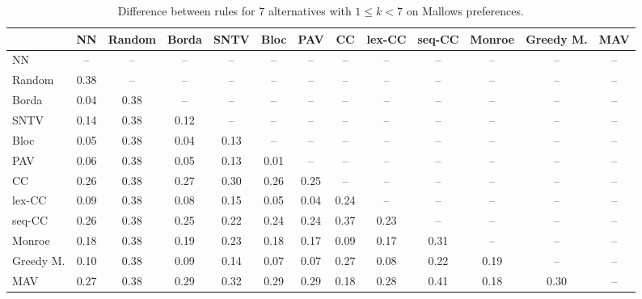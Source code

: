 
\begin{table*}[htbp]
\centering
\begin{tabular}{lcccccccccccc}
\toprule
 & NN & Random & Borda & SNTV & Bloc & PAV & CC & lex-CC & seq-CC & Monroe & Greedy M. & MAV \\
\midrule
NN & -- & -- & -- & -- & -- & -- & -- & -- & -- & -- & -- & -- \\
Random & \cellcolor{blue!38} 0.38 & -- & -- & -- & -- & -- & -- & -- & -- & -- & -- & -- \\
Borda & \cellcolor{blue!4} 0.04 & \cellcolor{blue!38} 0.38 & -- & -- & -- & -- & -- & -- & -- & -- & -- & -- \\
SNTV & \cellcolor{blue!14} 0.14 & \cellcolor{blue!38} 0.38 & \cellcolor{blue!12} 0.12 & -- & -- & -- & -- & -- & -- & -- & -- & -- \\
Bloc & \cellcolor{blue!5} 0.05 & \cellcolor{blue!38} 0.38 & \cellcolor{blue!4} 0.04 & \cellcolor{blue!13} 0.13 & -- & -- & -- & -- & -- & -- & -- & -- \\
PAV & \cellcolor{blue!6} 0.06 & \cellcolor{blue!38} 0.38 & \cellcolor{blue!5} 0.05 & \cellcolor{blue!13} 0.13 & \cellcolor{blue!1} 0.01 & -- & -- & -- & -- & -- & -- & -- \\
CC & \cellcolor{blue!26} 0.26 & \cellcolor{blue!38} 0.38 & \cellcolor{blue!27} 0.27 & \cellcolor{blue!30} 0.30 & \cellcolor{blue!26} 0.26 & \cellcolor{blue!25} 0.25 & -- & -- & -- & -- & -- & -- \\
lex-CC & \cellcolor{blue!9} 0.09 & \cellcolor{blue!38} 0.38 & \cellcolor{blue!8} 0.08 & \cellcolor{blue!15} 0.15 & \cellcolor{blue!5} 0.05 & \cellcolor{blue!4} 0.04 & \cellcolor{blue!24} 0.24 & -- & -- & -- & -- & -- \\
seq-CC & \cellcolor{blue!26} 0.26 & \cellcolor{blue!38} 0.38 & \cellcolor{blue!25} 0.25 & \cellcolor{blue!22} 0.22 & \cellcolor{blue!24} 0.24 & \cellcolor{blue!24} 0.24 & \cellcolor{blue!37} 0.37 & \cellcolor{blue!23} 0.23 & -- & -- & -- & -- \\
Monroe & \cellcolor{blue!18} 0.18 & \cellcolor{blue!38} 0.38 & \cellcolor{blue!19} 0.19 & \cellcolor{blue!23} 0.23 & \cellcolor{blue!18} 0.18 & \cellcolor{blue!17} 0.17 & \cellcolor{blue!9} 0.09 & \cellcolor{blue!17} 0.17 & \cellcolor{blue!31} 0.31 & -- & -- & -- \\
Greedy M. & \cellcolor{blue!10} 0.10 & \cellcolor{blue!38} 0.38 & \cellcolor{blue!9} 0.09 & \cellcolor{blue!14} 0.14 & \cellcolor{blue!7} 0.07 & \cellcolor{blue!7} 0.07 & \cellcolor{blue!27} 0.27 & \cellcolor{blue!8} 0.08 & \cellcolor{blue!22} 0.22 & \cellcolor{blue!19} 0.19 & -- & -- \\
MAV & \cellcolor{blue!27} 0.27 & \cellcolor{blue!38} 0.38 & \cellcolor{blue!28} 0.29 & \cellcolor{blue!32} 0.32 & \cellcolor{blue!28} 0.29 & \cellcolor{blue!28} 0.29 & \cellcolor{blue!18} 0.18 & \cellcolor{blue!28} 0.28 & \cellcolor{blue!41} 0.41 & \cellcolor{blue!18} 0.18 & \cellcolor{blue!30} 0.30 & -- \\
\bottomrule
\end{tabular}

\caption{Difference between rules for 7 alternatives with $1 \leq k < 7$ on Mallows preferences.}
\label{tab:rule_distance_heatmap-m=[7]-pref_dist=MALLOWS-RELPHI-R}
\end{table*}
    